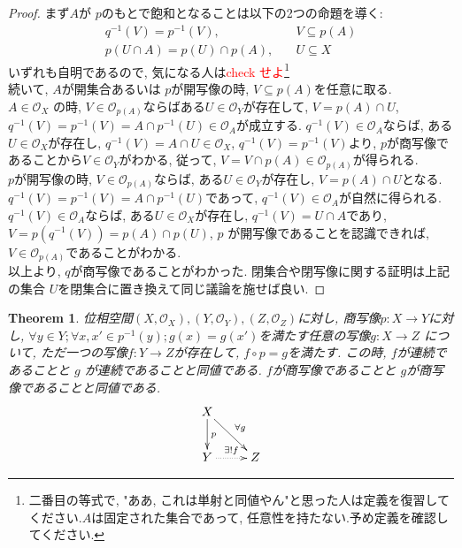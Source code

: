 \documentclass[lualatex]{ltjsbook}
\newtheorem{theorem}{Theorem}[chapter]
\theoremstyle{remark}
\theoremstyle{plain}
\begin{document}
\begin{proof}%
	まず$A$が $p$のもとで飽和となることは以下の2つの命題を導く:
	 \[
	\begin{aligned}%
		q^{-1}(V) = p ^{-1}(V),  \quad & V \subseteq p(A)\\
		p(U\cap A) = p(U) \cap p(A),  \quad & U\subseteq X 
	\end{aligned}
	\]
	いずれも自明であるので,  気になる人は\textcolor{red}{check せよ}\footnote{二番目の等式で,  "ああ, これは単射と同値やん"と思った人は定義を復習してください.$A$は固定された集合であって, 任意性を持たない.予め定義を確認してください.}\\
	続いて,  $A$が開集合あるいは $p$が開写像の時,   $V \subseteq p(A)$を任意に取る.\\
	$A \in \mathcal{O}_X$ の時,  $V \in \mathcal{O}_{p(A)}$ならばある$U \in \mathcal{O}_Y $が存在して,  
	$V = p(A) \cap U$,  $q^{-1}(V) = p ^{-1}(V) = A \cap p^{-1}(U) \in \mathcal{O}_A$が成立する. 
	$q^{-1}(V) \in \mathcal{O}_A$ならば,  ある$U \in \mathcal{O}_X$が存在し,  
	$q^{-1}(V) = A \cap U \in \mathcal{O}_X$,  $q^{-1}(V) = p ^{-1}(V)$より,  
	$p$が商写像であることから$V \in \mathcal{O}_Y$がわかる,  従って,  $V =V \cap p(A)\in \mathcal{O}_{p(A)}$が得られる. \\
	$p$が開写像の時,   $V \in \mathcal{O}_{p(A)}$ならば,  ある$U \in \mathcal{O}_Y$が存在し,  
	$V = p(A) \cap U$となる. 
	$q^{-1}(V) = p ^{-1}(V) = A \cap p ^{-1}(U)$であって,  
	$q^{-1}(V) \in \mathcal{O}_A$が自然に得られる. 
	$q^{-1}(V) \in \mathcal{O}_A$ならば,  ある$U \in \mathcal{O}_X$が存在し, 
	$q^{-1} (V) =U \cap A$であり,  $V=p(q^{-1}(V)) = p(A) \cap p(U)$,  
	$p$ が開写像であることを認識できれば,  $V \in \mathcal{O}_{p(A)}$であることがわかる.\\
	以上より,  $q$が商写像であることがわかった. 閉集合や閉写像に関する証明は上記の集合 $U$を閉集合に置き換えて同じ議論を施せば良い.
\end{proof}


\begin{theorem}%
	位相空間$\left( X,  \mathcal{O}_X \right) , \left( Y, \mathcal{O}_Y \right) ,  \left( Z ,  \mathcal{O}_Z\right) $に対し,  商写像$p: X \to Y$に対し,  $\forall y \in Y; \forall x , x'\in p ^{-1}({y});g(x)=g(x')$を満たす任意の写像$g: X \to Z$ について,  ただ一つの写像$f: Y\to Z$が存在して,  $f \circ p = g$を満たす. この時,   $f$が連続であることと $g$ が連続であることと同値である. $f$が商写像であることと $g$が商写像であることと同値である.
\[
	\xymatrix{
		X \ar[d]^{p} \ar[rd]^{\forall g} \\
		Y \ar@{..>}[r]^{\exists !f} &Z
	}
\] 		
\end{theorem}
\end{document}
